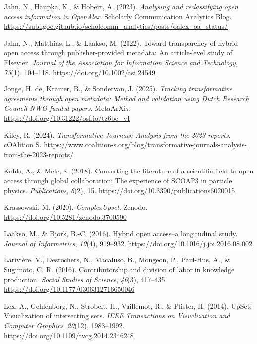 \documentclass[a4paper,man,floatsintext,longtable,noextraspace,10pt]{apa6}
\newlength{\cslhangindent}
\newenvironment{CSLReferences}[2] %
{\begin{list}{}{%
  \setlength{\itemindent}{0pt}
  \setlength{\leftmargin}{0pt}
  \setlength{\parsep}{0pt}
  \ifodd #1
  \setlength{\leftmargin}{\cslhangindent}
  \setlength{\itemindent}{-1\cslhangindent}
  \fi
  \setlength{\itemsep}{#2\baselineskip}}}
{\end{list}}
\begin{document}
\begin{CSLReferences}{1}{0}
Jahn, N., Haupka, N., \& Hobert, A. (2023). \emph{Analysing and
reclassifying open access information in OpenAlex}. {Scholarly
Communication Analytics Blog}.
\url{https://subugoe.github.io/scholcomm_analytics/posts/oalex_oa_status/}

Jahn, N., Matthias, L., \& Laakso, M. (2022). Toward transparency of
hybrid open access through publisher-provided metadata: An article-level
study of {Elsevier}. \emph{Journal of the Association for Information
Science and Technology}, \emph{73}(1), 104--118.
\url{https://doi.org/10.1002/asi.24549}

Jonge, H. de, Kramer, B., \& Sondervan, J. (2025). \emph{Tracking
transformative agreements through open metadata: Method and validation
using {Dutch Research Council NWO} funded papers}. MetaArXiv.
\url{https://doi.org/10.31222/osf.io/tz6be_v1}

Kiley, R. (2024). \emph{{Transformative Journals}: Analysis from the
2023 reports}. {cOAlition S}.
\url{https://www.coalition-s.org/blog/transformative-journals-analysis-from-the-2023-reports/}

Kohls, A., \& Mele, S. (2018). Converting the literature of a scientific
field to open access through global collaboration: The experience of
SCOAP3 in particle physics. \emph{Publications}, \emph{6}(2), 15.
\url{https://doi.org/10.3390/publications6020015}

Krassowski, M. (2020). \emph{ComplexUpset}. Zenodo.
\url{https://doi.org/10.5281/zenodo.3700590}

Laakso, M., \& Björk, B.-C. (2016). Hybrid open access--a longitudinal
study. \emph{Journal of Informetrics}, \emph{10}(4), 919--932.
\url{https://doi.org/10.1016/j.joi.2016.08.002}

Larivière, V., Desrochers, N., Macaluso, B., Mongeon, P., Paul-Hus, A.,
\& Sugimoto, C. R. (2016). Contributorship and division of labor in
knowledge production. \emph{Social Studies of Science}, \emph{46}(3),
417--435. \url{https://doi.org/10.1177/0306312716650046}

Lex, A., Gehlenborg, N., Strobelt, H., Vuillemot, R., \& Pfister, H.
(2014). UpSet: Visualization of intersecting sets. \emph{IEEE
Transactions on Visualization and Computer Graphics}, \emph{20}(12),
1983--1992. \url{https://doi.org/10.1109/tvcg.2014.2346248}


\end{CSLReferences}
\end{document}
